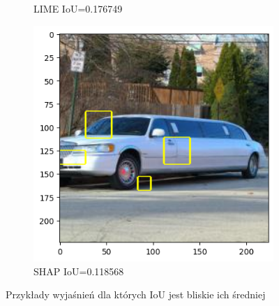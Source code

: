 \begin{figure}[h]
\begin{subfigure}[b]{0.3\textwidth}
		\caption{LIME IoU=0.176749}
	\end{subfigure}
	\begin{subfigure}[b]{0.3\textwidth}
		\includegraphics[width=.9\textwidth]{img/examples/appendix/n03670208_41512_shap}
		\caption{SHAP IoU=0.118568}
	\end{subfigure}
	\caption{Przykłady wyjaśnień dla których IoU jest bliskie ich średniej}
	\label{}
\end{figure}

